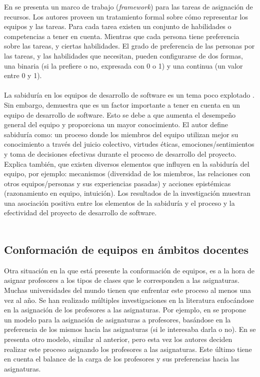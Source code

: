 En \cite{Anagnostopoulos2010} se presenta un marco de trabajo (\textit{framework}) para las tareas de asignación de recursos. Los autores proveen un tratamiento formal sobre cómo representar los equipos y las tareas. Para cada tarea existen un conjunto de habilidades o competencias a tener en cuenta. Mientras que cada persona tiene preferencia sobre las tareas, y ciertas habilidades. El grado de preferencia de las personas por las tareas, y las habilidades que necesitan, pueden configurarse de dos formas, una binaria (si la prefiere o no, expresada con 0 o 1) y una continua (un valor entre 0 y 1).\\\\


La sabiduría en los equipos de desarrollo de software es un tema poco explotado \cite{Akguen2020}. Sin embargo, \cite{Akguen2020} demuestra que es un factor importante a tener en cuenta en un equipo de desarrollo de software. Esto se debe a que aumenta el desempeño general del equipo y proporciona un mayor conocimiento. El autor define sabiduría como: un proceso donde los miembros del equipo utilizan mejor su conocimiento a través del juicio colectivo, virtudes éticas, emociones/sentimientos y toma de decisiones efectivas durante el proceso de desarrollo del proyecto. Explica también, que existen diversos elementos que influyen en la sabiduría del equipo, por ejemplo: mecanismos (diversidad de los miembros, las relaciones con otros equipos/personas y sus experiencias pasadas) y acciones epistémicas (razonamiento en equipo, intuición). Los resultados de la investigación muestran una asociación positiva entre los elementos de la sabiduría y el proceso y la efectividad del proyecto de desarrollo de software.\\\\



\subsection{Conformación de equipos en ámbitos docentes}

Otra situación en la que está presente la conformación de equipos, es a la hora de asignar profesores a los tipos de clases que le corresponden a las asignaturas. Muchas universidades del mundo tienen que enfrentar este proceso al menos una vez al año. Se han realizado múltiples investigaciones en la literatura enfocándose en la asignación de los profesores a las asignaturas. Por ejemplo, en \cite{Bosquez2020} se propone un modelo para la asignación de asignaturas a profesores, basándose en la preferencia de los mismos hacia las asignaturas (si le interesaba darla o no). En \cite{Domenech2014} se presenta otro modelo, similar al anterior, pero esta vez los autores deciden realizar este proceso asignando los profesores a las asignaturas. Este último tiene en cuenta el balance de la carga de los profesores y sus preferencias hacia las asignaturas. \\\\


